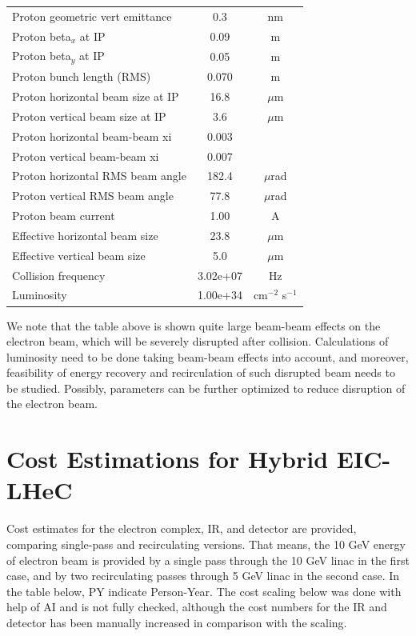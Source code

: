 \documentclass{article}
\begin{document}
\begin{longtable}{lcc}
Proton geometric vert emittance & 0.3 & nm \\
Proton beta$_x$ at IP & 0.09 & m \\
Proton beta$_y$ at IP & 0.05 & m \\
Proton bunch length (RMS) & 0.070 & m \\
Proton horizontal beam size at IP & 16.8 & $\mu$m \\
Proton vertical beam size at IP & 3.6 & $\mu$m \\
Proton horizontal beam-beam xi & 0.003 &  \\
Proton vertical beam-beam xi & 0.007 &  \\
Proton horizontal RMS beam angle & 182.4 & $\mu$rad \\
Proton vertical RMS beam angle & 77.8 & $\mu$rad \\
Proton beam current & 1.00 & A \\
Effective horizontal beam size & 23.8 & $\mu$m \\
Effective vertical beam size & 5.0 & $\mu$m \\
Collision frequency & 3.02e+07 & Hz \\
Luminosity & 1.00e+34 & cm$^{-2}$ s$^{-1}$ \\
\bottomrule
\end{longtable}

We note that the table above is shown quite large beam-beam effects on the electron beam, which will be severely disrupted after collision. Calculations of luminosity need to be done taking beam-beam effects into account, and moreover, feasibility of energy recovery and recirculation of such disrupted beam needs to be studied. Possibly, parameters can be further optimized to reduce disruption of the electron beam.   

\section{Cost Estimations for Hybrid EIC-LHeC}

Cost estimates for the electron complex, IR, and detector are provided, comparing single-pass and recirculating versions. That means, the 10 GeV energy of electron beam is provided by a single pass through the 10 GeV linac in the first case, and by two recirculating passes through 5 GeV linac in the second case. 
In the table below, PY indicate Person-Year. The cost scaling below was done with help of AI and is not fully checked, although the cost numbers for the IR and detector has been manually increased in comparison with the scaling. 
\end{document}
